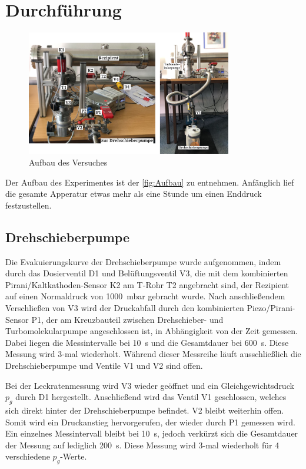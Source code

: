 \section{Durchführung}
\label{sec:Durchführung}

\begin{figure}
    \centering
    \includegraphics[width=0.8\textwidth]{abb/Aufbau.png}
    \caption{Aufbau des Versuches}
    \label{fig:Aufbau}
\end{figure}

Der Aufbau des Experimentes ist der \autoref{fig:Aufbau} zu entnehmen. Anfänglich lief die gesamte Apperatur etwas mehr als eine Stunde um einen Enddruck festzustellen.

\subsection{Drehschieberpumpe}
Die Evakuierungskurve der Drehschieberpumpe wurde aufgenommen, indem durch das Dosierventil D1 und Belüftungsventil V3, die mit dem kombinierten Pirani/Kaltkathoden-Sensor K2
am T-Rohr T2 angebracht sind, der Rezipient auf einen Normaldruck von \SI{1000}{\milli\bar} gebracht wurde. 
Nach anschließendem Verschließen von V3 wird der Druckabfall durch den kombinierten Piezo/Pirani-Sensor P1, der am Kreuzbauteil zwischen
Drehschieber- und Turbomolekularpumpe angeschlossen ist, in Abhängigkeit von der Zeit gemessen.
Dabei liegen die Messintervalle bei \SI{10}{\second} und die Gesamtdauer bei \SI{600}{\second}. Diese Messung wird 3-mal wiederholt. Während dieser Messreihe
läuft ausschließlich die Drehschieberpumpe und Ventile V1 und V2 sind offen.

Bei der Leckratenmessung wird V3 wieder geöffnet und ein Gleichgewichtsdruck $p_g$ durch D1 hergestellt. Anschließend wird das Ventil V1 geschlossen, welches sich direkt hinter der
Drehschieberpumpe befindet. V2 bleibt weiterhin offen. Somit wird ein Druckanstieg hervorgerufen, der wieder durch P1 gemessen wird. Ein einzelnes Messintervall bleibt bei \SI{10}{\second},
jedoch verkürzt sich die Gesamtdauer der Messung auf lediglich \SI{200}{\second}. Diese Messung wird 3-mal wiederholt für 4 verschiedene $p_g$-Werte.


